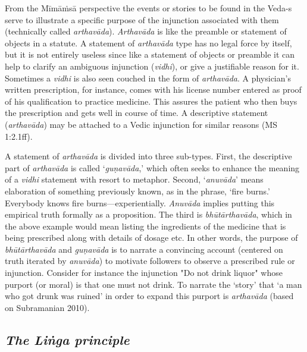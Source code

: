 From the Mīmāṁsā perspective the events or stories to be found in the Veda-s serve to illustrate a specific purpose of the injunction associated with them (technically called \textit{arthavāda}). \textit{Arthavāda} is like the preamble or statement of objects in a statute. A statement of \textit{arthavāda }type has no legal force by itself, but it is not entirely useless since like a statement of objects or preamble it can help to clarify an ambiguous injunction (\textit{vidhi}), or give a justifiable reason for it. Sometimes a \textit{vidhi} is also seen couched in the form of \textit{arthavāda}. A physician’s written prescription, for instance, comes with his license number entered as proof of his qualification to practice medicine. This assures the patient who then buys the prescription and gets well in course of time. A descriptive statement (\textit{arthavāda}) may be attached to a Vedic injunction for similar reasons (MS 1:2.1ff). 

A statement of \textit{arthavāda} is divided into three sub-types. First, the descriptive part of \textit{arthavāda} is called ‘\textit{guṇavāda},’ which often seeks to enhance the meaning of a \textit{vidhi }statement with resort to metaphor. Second, ‘\textit{anuvāda}’ means elaboration of something previously known, as in the phrase, ‘fire burns.’ Everybody knows fire burns—experientially. \textit{Anuvāda} implies putting this empirical truth formally as a proposition. The third is \textit{bhūtārthavāda}, which in the above example would mean listing the ingredients of the medicine that is being prescribed along with details of dosage etc. In other words, the purpose of \textit{bhūtārthavāda} and \textit{guṇavāda }is to narrate a convincing account (centered on truth iterated by \textit{anuvāda}) to motivate followers to observe a prescribed rule or injunction. Consider for instance the injunction "Do not drink liquor" whose purport (or moral) is that one must not drink. To narrate the ‘story’ that ‘a man who got drunk was ruined’ in order to expand this purport is \textit{arthavāda} (based on Subramanian 2010).


\subsection*{\textit{The Liṅga principle}}

